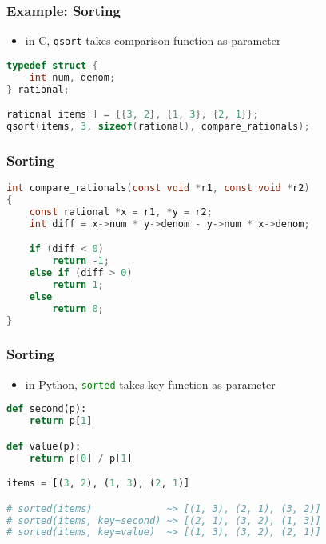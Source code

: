 \documentclass[dvipsnames]{beamer}
\theoremstyle{plain}
\begin{document}
\begin{frame}[fragile]
  \frametitle{Example: Sorting}

  \begin{exampleblock}{}
    \begin{itemize}
      \item in C, \lstinline[language=C]{qsort} takes comparison function
        as parameter
    \end{itemize}

    \begin{lstlisting}[language=C]
typedef struct {
    int num, denom;
} rational;

rational items[] = {{3, 2}, {1, 3}, {2, 1}};
qsort(items, 3, sizeof(rational), compare_rationals);
    \end{lstlisting}
  \end{exampleblock}
\end{frame}

\begin{frame}[fragile]
  \frametitle{Sorting}

  \begin{exampleblock}{}
    \begin{lstlisting}[language=C]
int compare_rationals(const void *r1, const void *r2)
{
    const rational *x = r1, *y = r2;
    int diff = x->num * y->denom - y->num * x->denom;

    if (diff < 0)
        return -1;
    else if (diff > 0)
        return 1;
    else
        return 0;
}
    \end{lstlisting}
  \end{exampleblock}
\end{frame}

\begin{frame}[fragile]
  \frametitle{Sorting}

  \begin{exampleblock}{}
    \begin{itemize}
      \item in Python, \lstinline[language=Python]{sorted} takes key function
        as parameter
    \end{itemize}

    \begin{lstlisting}[language=Python]
def second(p):
    return p[1]

def value(p):
    return p[0] / p[1]

items = [(3, 2), (1, 3), (2, 1)]

# sorted(items)             ~> [(1, 3), (2, 1), (3, 2)]
# sorted(items, key=second) ~> [(2, 1), (3, 2), (1, 3)]
# sorted(items, key=value)  ~> [(1, 3), (3, 2), (2, 1)]
    \end{lstlisting}
  \end{exampleblock}
\end{frame}
\end{document}
